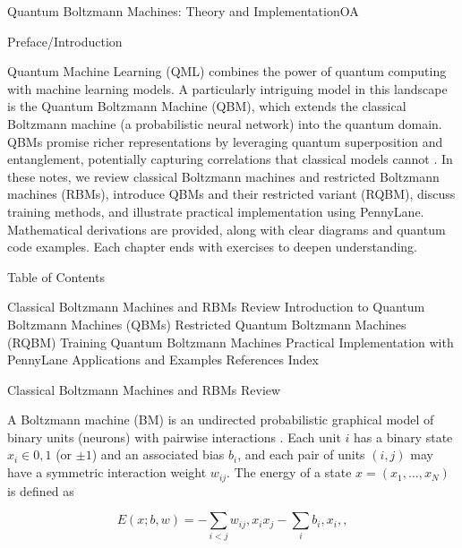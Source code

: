 Quantum Boltzmann Machines: Theory and ImplementationOA







Preface/Introduction





Quantum Machine Learning (QML) combines the power of quantum computing
with machine learning models. A particularly intriguing model in this
landscape is the Quantum Boltzmann Machine (QBM), which extends the
classical Boltzmann machine (a probabilistic neural network) into the
quantum domain. QBMs promise richer representations by leveraging
quantum superposition and entanglement, potentially capturing
correlations that classical models cannot . In these notes, we review
classical Boltzmann machines and restricted Boltzmann machines (RBMs),
introduce QBMs and their restricted variant (RQBM), discuss training
methods, and illustrate practical implementation using
PennyLane. Mathematical derivations are provided, along with clear
diagrams and quantum code examples. Each chapter ends with exercises
to deepen understanding.





Table of Contents





Classical Boltzmann Machines and RBMs Review
Introduction to Quantum Boltzmann Machines (QBMs)
Restricted Quantum Boltzmann Machines (RQBM)
Training Quantum Boltzmann Machines
Practical Implementation with PennyLane
Applications and Examples
References
Index






Classical Boltzmann Machines and RBMs Review





A Boltzmann machine (BM) is an undirected probabilistic graphical model of binary units (neurons) with pairwise interactions . Each unit $i$ has a binary state $x_i\in{0,1}$ (or $\pm1$) and an associated bias $b_i$, and each pair of units $(i,j)$ may have a symmetric interaction weight $w_{ij}$. The energy of a state $x=(x_1,\dots,x_N)$ is defined as

$$

E(x; b,w) = -\sum_{i<j} w_{ij},x_i x_j - \sum_{i} b_i,x_i,,

$$


